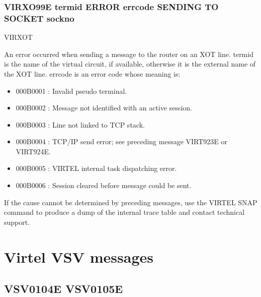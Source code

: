\documentclass[letterpaper,10pt,english]{sphinxmanual}
\begin{document}
\subsubsection{VIRXO99E termid ERROR errcode SENDING TO SOCKET sockno}
\label{\detokenize{messages:virxo99e-termid-error-errcode-sending-to-socket-sockno}}\begin{description}
\sphinxAtStartPar
VIRXOT

\sphinxAtStartPar
An error occurred when sending a message to the router on an XOT line. termid is the name of the virtual circuit, if available, otherwise it is the external name of the XOT line. errcode is an error code whose meaning is:
\begin{itemize}
\item {} 
\sphinxAtStartPar
000B0001 : Invalid pseudo terminal.

\item {} 
\sphinxAtStartPar
000B0002 : Message not identified with an active session.

\item {} 
\sphinxAtStartPar
000B0003 : Line not linked to TCP stack.

\item {} 
\sphinxAtStartPar
000B0004 : TCP/IP send error; see preceding message VIRT923E or VIRT924E.

\item {} 
\sphinxAtStartPar
000B0005 : VIRTEL internal task dispatching error.

\item {} 
\sphinxAtStartPar
000B0006 : Session cleared before message could be sent.

\end{itemize}

\sphinxAtStartPar
If the cause cannot be determined by preceding messages, use the VIRTEL SNAP command to produce a dump of the internal trace table and contact technical support.

\end{description}


\section{Virtel VSV messages}
\label{\detokenize{messages:virtel-vsv-messages}}

\subsection{VSV0104E \sphinxhyphen{} VSV0105E}
\label{\detokenize{messages:vsv0104e-vsv0105e}}
\end{document}

